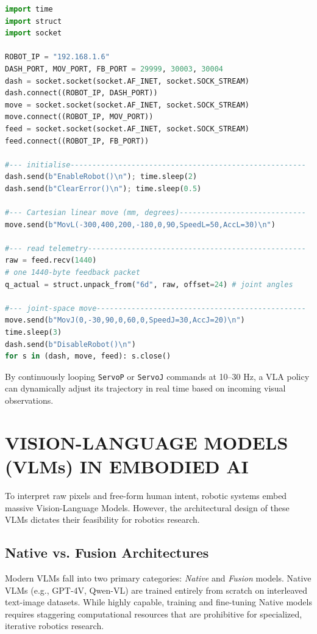 \begin{lstlisting}[language=Python, caption={Python TCP/IP control loop for Dobot CR5}]
import time
import struct
import socket

ROBOT_IP = "192.168.1.6"
DASH_PORT, MOV_PORT, FB_PORT = 29999, 30003, 30004
dash = socket.socket(socket.AF_INET, socket.SOCK_STREAM)
dash.connect((ROBOT_IP, DASH_PORT))
move = socket.socket(socket.AF_INET, socket.SOCK_STREAM)
move.connect((ROBOT_IP, MOV_PORT))
feed = socket.socket(socket.AF_INET, socket.SOCK_STREAM)
feed.connect((ROBOT_IP, FB_PORT))

#--- initialise------------------------------------------------------
dash.send(b"EnableRobot()\n"); time.sleep(2)
dash.send(b"ClearError()\n"); time.sleep(0.5)

#--- Cartesian linear move (mm, degrees)-----------------------------
move.send(b"MovL(-300,400,200,-180,0,90,SpeedL=50,AccL=30)\n")

#--- read telemetry--------------------------------------------------
raw = feed.recv(1440)
# one 1440-byte feedback packet
q_actual = struct.unpack_from("6d", raw, offset=24) # joint angles

#--- joint-space move------------------------------------------------
move.send(b"MovJ(0,-30,90,0,60,0,SpeedJ=30,AccJ=20)\n")
time.sleep(3)
dash.send(b"DisableRobot()\n")
for s in (dash, move, feed): s.close()
\end{lstlisting}

By continuously looping {\scriptsize\texttt{ServoP}} or {\scriptsize\texttt{ServoJ}} commands at 10--30 Hz, a VLA policy can dynamically adjust its trajectory in real time based on incoming visual observations.

\section{VISION-LANGUAGE MODELS (VLMs) IN EMBODIED AI}

To interpret raw pixels and free-form human intent, robotic systems embed massive Vision-Language Models. However, the architectural design of these VLMs dictates their feasibility for robotics research.

\subsection{Native vs. Fusion Architectures}

Modern VLMs fall into two primary categories: \textit{Native} and \textit{Fusion} models. Native VLMs (e.g., GPT-4V, Qwen-VL) are trained entirely from scratch on interleaved text-image datasets. While highly capable, training and fine-tuning Native models requires staggering computational resources that are prohibitive for specialized, iterative robotics research.

